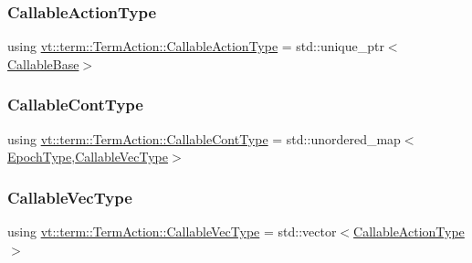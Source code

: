 \subsubsection{\texorpdfstring{Callable\+Action\+Type}{CallableActionType}}
{\footnotesize\ttfamily using \hyperlink{structvt_1_1term_1_1_term_action_aa4a32326730b20530526e1db6512c017}{vt\+::term\+::\+Term\+Action\+::\+Callable\+Action\+Type} =  std\+::unique\+\_\+ptr$<$\hyperlink{structvt_1_1term_1_1_callable_base}{Callable\+Base}$>$}

\mbox{\label{structvt_1_1term_1_1_term_action_a802aaa899ce87dc9f8a53d43b202044c}} 
\subsubsection{\texorpdfstring{Callable\+Cont\+Type}{CallableContType}}
{\footnotesize\ttfamily using \hyperlink{structvt_1_1term_1_1_term_action_a802aaa899ce87dc9f8a53d43b202044c}{vt\+::term\+::\+Term\+Action\+::\+Callable\+Cont\+Type} =  std\+::unordered\+\_\+map$<$\hyperlink{namespacevt_a985a5adf291c34a3ca263b3378388236}{Epoch\+Type},\hyperlink{structvt_1_1term_1_1_term_action_ad9e499fefd57d3bea8e0cae68a6b7f61}{Callable\+Vec\+Type}$>$}

\mbox{\label{structvt_1_1term_1_1_term_action_ad9e499fefd57d3bea8e0cae68a6b7f61}} 
\subsubsection{\texorpdfstring{Callable\+Vec\+Type}{CallableVecType}}
{\footnotesize\ttfamily using \hyperlink{structvt_1_1term_1_1_term_action_ad9e499fefd57d3bea8e0cae68a6b7f61}{vt\+::term\+::\+Term\+Action\+::\+Callable\+Vec\+Type} =  std\+::vector$<$\hyperlink{structvt_1_1term_1_1_term_action_aa4a32326730b20530526e1db6512c017}{Callable\+Action\+Type}$>$}

\mbox{\label{structvt_1_1term_1_1_term_action_acefe3cb1e2a2bcf0d530082f53a2bada}} 
